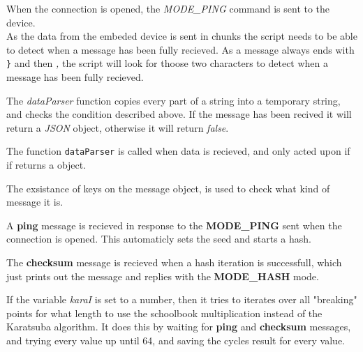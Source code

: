 When the connection is opened, the \textit{MODE\_PING} command is sent to the device.\\


As the data from the embeded device is sent in chunks the script needs to be able to detect when a message has been fully recieved. As a message always ends with \texttt{\}} and then \textit{,} the script will look for thoose two characters to detect when a message has been fully recieved.

The \textit{dataParser} function copies every part of a string into a temporary string, and checks the condition described above. If the message has been recived it will return a \textit{JSON} object, otherwise it will return \textit{false}.

The function \texttt{dataParser} is called when data is recieved, and only acted upon if if returns a object.  

The exsistance of keys on the message object, is used to check what kind of message it is.

A \textbf{ping} message is recieved in response to the \textbf{MODE\_PING} sent when the connection is opened. This automaticly sets the seed and starts a hash.

The \textbf{checksum} message is recieved when a hash iteration is successfull, which just prints out the message and replies with the \textbf{MODE\_HASH} mode.

If the variable \textit{karaI} is set to a number, then it tries to iterates over all "breaking" points for what length to use the schoolbook multiplication instead of the Karatsuba algorithm. It does this by waiting for \textbf{ping} and \textbf{checksum} messages, and trying every value up until 64, and saving the cycles result for every value.
